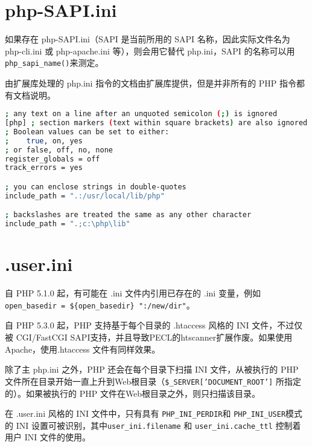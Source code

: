 \section{php-SAPI.ini}


如果存在 php-SAPI.ini（SAPI 是当前所用的 SAPI 名称，因此实际文件名为 php-cli.ini 或 php-apache.ini 等），则会用它替代 php.ini，SAPI 的名称可以用 \texttt{php\_sapi\_name()}来测定。


由扩展库处理的 php.ini 指令的文档由扩展库提供，但是并非所有的 PHP 指令都有文档说明。





\begin{lstlisting}[language=bash]
; any text on a line after an unquoted semicolon (;) is ignored
[php] ; section markers (text within square brackets) are also ignored
; Boolean values can be set to either:
;    true, on, yes
; or false, off, no, none
register_globals = off
track_errors = yes

; you can enclose strings in double-quotes
include_path = ".:/usr/local/lib/php"

; backslashes are treated the same as any other character
include_path = ".;c:\php\lib"
\end{lstlisting}


\section{.user.ini}



\begin{compactitem}
\item 自 PHP 5.1.0 起，有可能在 .ini 文件内引用已存在的 .ini 变量，例如\texttt{open\_basedir = \$\{open\_basedir\} ":/new/dir"}。

\item 自 PHP 5.3.0 起，PHP 支持基于每个目录的 .htaccess 风格的 INI 文件，不过仅被 CGI/FastCGI SAPI支持，并且导致PECL的htscanner扩展作废。如果使用 Apache，使用.htaccess 文件有同样效果。
\end{compactitem}

除了主 php.ini 之外，PHP 还会在每个目录下扫描 INI 文件，从被执行的 PHP 文件所在目录开始一直上升到Web根目录（\texttt{\$\_SERVER['DOCUMENT\_ROOT']} 所指定的）。如果被执行的 PHP 文件在Web根目录之外，则只扫描该目录。

在 .user.ini 风格的 INI 文件中，只有具有 \texttt{PHP\_INI\_PERDIR}和 \texttt{PHP\_INI\_USER}模式的 INI 设置可被识别，其中\texttt{user\_ini.filename} 和 \texttt{user\_ini.cache\_ttl} 控制着用户 INI 文件的使用。

